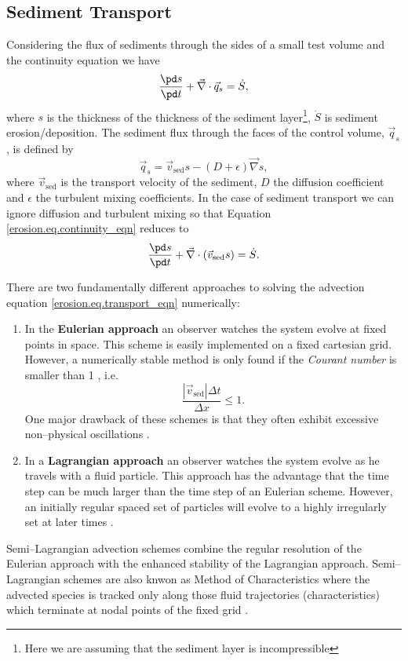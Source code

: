 \subsection{Sediment Transport}
Considering the flux of sediments through the sides of a small test volume and the continuity equation we have
\begin{equation}
  \label{erosion.eq.continuity_eqn}
  \frac{\pd s}{\pd t}+\vec\nabla\cdot\vec{q}_s=\dot{S},
\end{equation}
where $s$ is the thickness of the thickness of the sediment layer\footnote{Here we are assuming that the sediment layer is incompressible}, $\dot{S}$ is sediment erosion/deposition. The sediment flux through the faces of the control volume, $\vec{q}_s$, is defined by
\begin{equation}
  \vec{q}_s=\vec{v}_{\text{sed}}s-(D+\epsilon)\vec\nabla s,
\end{equation}
where $\vec{v}_{\text{sed}}$ is the transport velocity of the sediment, $D$ the diffusion coefficient and $\epsilon$ the turbulent mixing coefficients. In the case of sediment transport we can ignore diffusion and turbulent mixing so that Equation \eqref{erosion.eq.continuity_eqn} reduces to
\begin{equation}
  \label{erosion.eq.transport_eqn}
  \frac{\pd s}{\pd t}+\vec\nabla\cdot(\vec{v}_{\text{sed}}s)=\dot{S}.
\end{equation}

There are two fundamentally different approaches to solving the advection equation \eqref{erosion.eq.transport_eqn} numerically:
\begin{enumerate}
\item In the \textbf{Eulerian approach} an observer watches the system evolve at fixed points in space. This scheme is easily implemented on a fixed cartesian grid. However, a numerically stable method is only found if the \emph{Courant number} is smaller than 1 \citep{Press1992}, i.e.
  \begin{equation}
    \frac{|\vec{v}_{\text{sed}}|\Delta t}{\Delta x}\le1.
  \end{equation}
  One major drawback of these schemes is that they often exhibit excessive non--physical oscillations \citep{Celia1990}.
\item In a \textbf{Lagrangian approach} an observer watches the system evolve as he travels with a fluid particle. This approach has the advantage that the time step can be much larger than the time step of an Eulerian scheme. However, an initially regular spaced set of particles will evolve to a highly irregularly set at later times \citep{Staniforth1991}.
\end{enumerate}
Semi--Lagrangian advection schemes combine the regular resolution of the Eulerian approach with the enhanced stability of the Lagrangian approach. Semi--Lagrangian schemes are also knwon as Method of Characteristics where the advected species is tracked only along those fluid trajectories (characteristics) which terminate at nodal points of the fixed grid \citep{Manson2000}.

